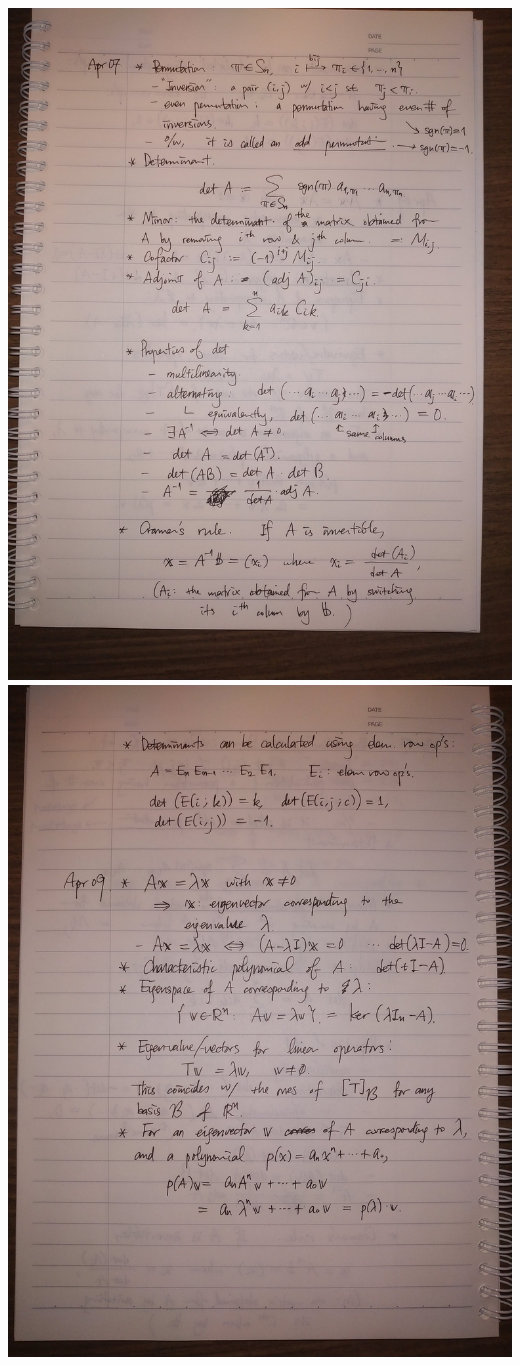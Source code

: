 \documentclass{homework}
\begin{document}
\includegraphics[width=\textwidth,origin=c]{note1.jpg}
\includegraphics[width=\textwidth,origin=c]{note2.jpg}
\end{document}
